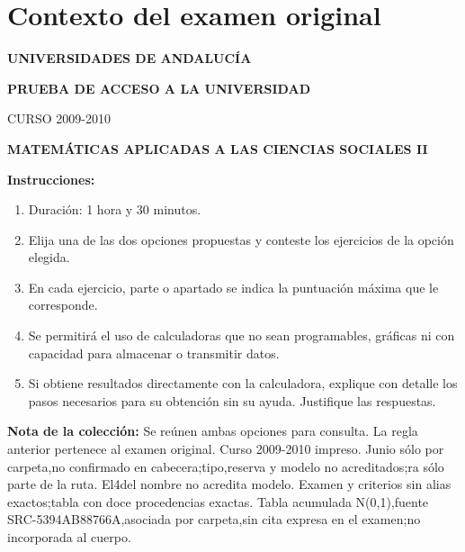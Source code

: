 \section*{Contexto del examen original}
\textbf{UNIVERSIDADES DE ANDALUCÍA}\par
\textbf{PRUEBA DE ACCESO A LA UNIVERSIDAD}\par
CURSO 2009-2010\par
\textbf{MATEMÁTICAS APLICADAS A LAS CIENCIAS SOCIALES II}

\textbf{Instrucciones:}
\begin{enumerate}[label=\textbf{\alph*)}]
  \item Duración: 1 hora y 30 minutos.
  \item Elija una de las dos opciones propuestas y conteste los ejercicios de la opción elegida.
  \item En cada ejercicio, parte o apartado se indica la puntuación máxima que le corresponde.
  \item Se permitirá el uso de calculadoras que no sean programables, gráficas ni con capacidad para almacenar o transmitir datos.
  \item Si obtiene resultados directamente con la calculadora, explique con detalle los pasos necesarios para su obtención sin su ayuda. Justifique las respuestas.
\end{enumerate}
\noindent\textbf{Nota de la colección:} Se reúnen ambas opciones para consulta. La regla anterior pertenece al examen original. Curso 2009-2010 impreso. Junio sólo por carpeta,no confirmado en cabecera;tipo,reserva y modelo no acreditados;ra sólo parte de la ruta. El4del nombre no acredita modelo. Examen y criterios sin alias exactos;tabla con doce procedencias exactas. Tabla acumulada N(0,1),fuente SRC-5394AB88766A,asociada por carpeta,sin cita expresa en el examen;no incorporada al cuerpo.
\par\medskip

